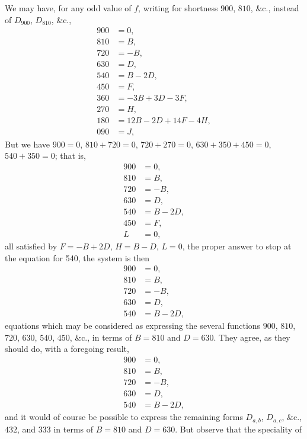 \documentclass[11pt,a4paper]{book}
\begin{document}
\bigskip

\noindent We may have, for any odd value of $f$, writing for shortness $900$, $810$, $\&\text{c.}$, instead of $D_{900}$, $D_{810}$, $\&\text{c.}$,
\begin{align*}
900 &= 0, \\
810 &= B, \\
720 &= -B, \\
630 &= D, \\
540 &= B - 2D, \\
450 &= F, \\
360 &= -3B + 3D - 3F, \\
270 &= H, \\
180 &= 12B - 2D + 14F - 4H, \\
090 &= J,
\end{align*}
But we have $900 = 0$, $810 + 720 = 0$, $720 + 270 = 0$, $630 + 350 + 450 = 0$, $540 + 350 = 0$;
that is,
\begin{align*}
900 &= 0, \\
810 &= B, \\
720 &= -B, \\
630 &= D, \\
540 &= B - 2D, \\
450 &= F, \\
L &= 0,
\end{align*}
all satisfied by $F = -B + 2D$, $H = B - D$, $L = 0$, the proper answer to stop at the equation for 540, the system is then
\begin{align*}
900 &= 0, \\
810 &= B, \\
720 &= -B, \\
630 &= D, \\
540 &= B - 2D,
\end{align*}
equations which may be considered as expressing the several functions $900$, $810$, $720$, $630$, $540$, $450$, $\&\text{c.}$, in terms of $B = 810$ and $D = 630$. They agree, as they should do, with a foregoing result,
\begin{align*}
900 &= 0, \\
810 &= B, \\
720 &= -B, \\
630 &= D, \\
540 &= B - 2D,
\end{align*}
and it would of course be possible to express the remaining forms $D_{a,b}$, $D_{a,c}$, $\&\text{c.}$, $432$, and $333$ in terms of $B = 810$ and $D = 630$. But observe that the speciality of
\clearpage
\end{document}
